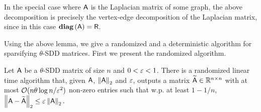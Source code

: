 \begin{remark}
In the special case where ${\mathsf{A} }$ is the Laplacian matrix of some graph, the above decomposition is precisely the vertex-edge decomposition of the Laplacian matrix, since in this case $\operatorname{\textbf{diag}}\left({\mathsf{A} }\right) ={\mathsf{R} }$.
\end{remark}
Using the above lemma, we give a randomized and a deterministic algorithm for sparsifying $\theta$-SDD matrices. First we present the randomized algorithm.
\begin{theorem}\label{thm:matrix_sparsif:rand}
Let ${\mathsf{A} }$ be a $\theta$-SDD matrix of size $n$ and $ 0 < \varepsilon <1$.  There is a randomized linear time algorithm that, given ${\mathsf{A} }$, $\left\|{\mathsf{A} }\right\|_2$ and $\varepsilon$, outputs a matrix $\widetilde{{\mathsf{A} }}\in \mathbb{R}^{n\times n}$ with at most $\mathcal{O}( n\theta \log n /\varepsilon^2)$ non-zero entries such that w.p. at least $1-1/n$, $\left\|{\mathsf{A} } - \widetilde{{\mathsf{A} }}\right\|_2 \leq \varepsilon \left\|{\mathsf{A} }\right\|_2.$
\end{theorem}
